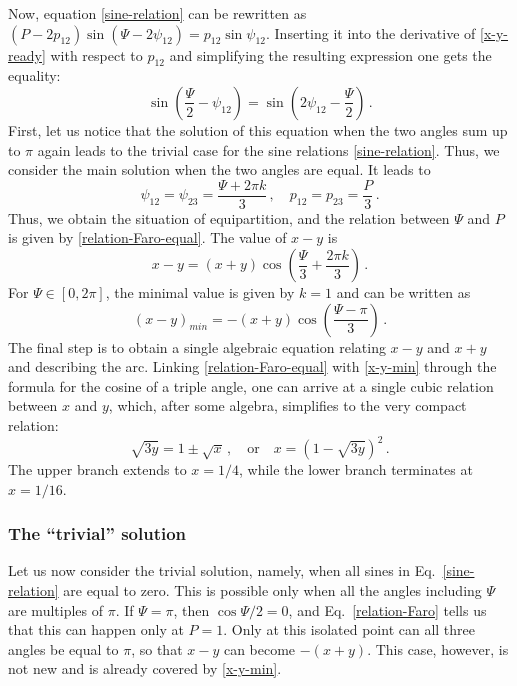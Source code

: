 \documentclass[11pt]{article}
\begin{document}
Now, equation \eqref{sine-relation} can be rewritten as  
$(P - 2p_{12})\sin(\Psi-2\psi_{12}) = p_{12}\sin \psi_{12}$. 
Inserting it into the derivative of \eqref{x-y-ready} with respect to $p_{12}$ and simplifying the resulting expression one gets the equality:
\begin{equation}
\sin\left(\frac{\Psi}{2}-\psi_{12}\right) = \sin\left(2\psi_{12} - \frac{\Psi}{2}\right)\,.
\end{equation}
First, let us notice that the solution of this equation
when the two angles sum up to $\pi$ again leads to the trivial case for the sine relations \eqref{sine-relation}.
Thus, we consider the main solution when the two angles are equal. It leads to
\begin{equation}
\psi_{12} = \psi_{23} = \frac{\Psi + 2\pi k}{3}\,, \quad p_{12} = p_{23} = \frac{P}{3}\,.\label{minimum-points}
\end{equation}
Thus, we obtain the situation of equipartition, 
and the relation between $\Psi$ and $P$ is given by \eqref{relation-Faro-equal}.
The value of $x-y$ is
\begin{equation}
x-y = (x+y)\cos\left(\frac{\Psi}{3} + \frac{2\pi k}{3}\right)\,.
\end{equation}
For $\Psi \in [0, 2\pi]$, the minimal value is given by $k=1$ and can be written as
\begin{equation}
(x-y)_{min} = -(x+y)\cos\left(\frac{\Psi - \pi}{3}\right)\,.\label{x-y-min}
\end{equation}
The final step is to obtain a single algebraic equation relating $x-y$
and $x+y$ and describing the arc. 
Linking \eqref{relation-Faro-equal} with \eqref{x-y-min} through the formula for the cosine of a triple angle,
one can arrive at a single cubic relation between $x$ and $y$, which, after some algebra, simplifies to
the very compact relation:
\begin{equation}
\sqrt{3y} = 1\pm\sqrt{x}\,, \quad \mbox{or}\quad x = (1-\sqrt{3y})^2\,.\label{ridiculous}
\end{equation}
The upper branch extends to $x = 1/4$, while the lower branch terminates at $x = 1/16$.

\subsubsection{The ``trivial'' solution}

Let us now consider the trivial solution, namely, when all sines in Eq.~\eqref{sine-relation} are equal to zero.
This is possible only when all the angles including $\Psi$ are multiples of $\pi$.
If $\Psi = \pi$, then $\cos\Psi/2 = 0$, and Eq.~\eqref{relation-Faro} tells us that this can happen only at $P = 1$.
Only at this isolated point can all three angles be equal to $\pi$, so that 
$x-y$ can become $-(x+y)$. This case, however, is not new and is already covered by \eqref{x-y-min}.
\end{document}
